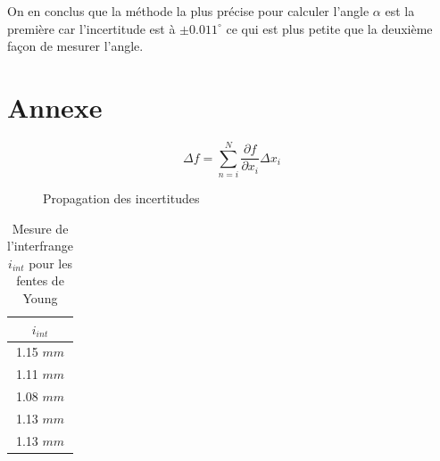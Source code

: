 \documentclass[11pt, openright]{book}
\begin{document}
			On en conclus que la méthode la plus précise pour calculer l'angle $\alpha $ est la première car l'incertitude est à $\pm 0.011^{\circ}$ ce qui est plus petite que la deuxième façon de mesurer l'angle.
			

			\section{Annexe}


			
			
			\begin{figure}[ht!]
				\centering
				$$\Delta f = \sum_{n=i}^{N}\frac{\partial f}{\partial x_i}\Delta x_i $$
				\caption{Propagation des incertitudes}
			\end{figure}

			\begin{table}[ht!]
				\centering
				\begin{tabular}{|c|}
					\hline
					$i_{int}$\\
					\hline
					1.15 $mm$\\
					1.11 $mm$\\
					1.08 $mm$\\
					1.13 $mm$\\
					1.13 $mm$\\
					\hline
					
				\end{tabular}
				\caption{Mesure de l'interfrange $i_{int}$ pour les fentes de Young}
			\end{table}
\end{document}
